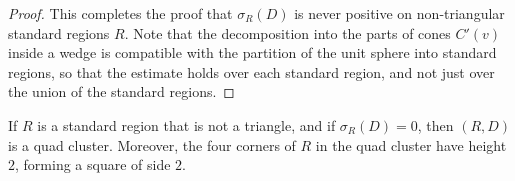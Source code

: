 \begin{proof}







This completes the proof that $\sigma_R(D)$ is never positive on
non-triangular standard regions $R$.  Note that the decomposition
into the parts of cones $C'(v)$ inside a wedge is compatible with
the partition of the unit sphere into standard regions, so that
the estimate holds over each standard region, and not just over
the union of the standard regions.
%
\end{proof}






\begin{lemma}  If $R$ is a standard region that is not a triangle,
and if $\sigma_R(D)=0$, then $(R,D)$ is a quad cluster.  Moreover,
the four corners of $R$ in the quad cluster have height $2$,
forming a square of side $2$.
\end{lemma}

